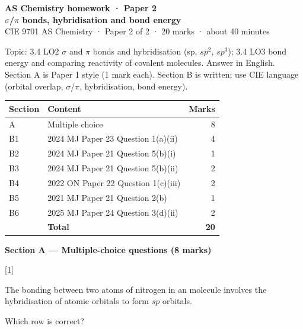\documentclass[10pt,a4paper]{article}
\newcommand{\homeworktitle}{Chemistry homework}
\newcommand{\homeworkmarks}{}
\newcommand{\sethomework}[2]{%
  \renewcommand{\homeworktitle}{#1}%
  \renewcommand{\homeworkmarks}{#2}%
}
\newcommand{\qhead}[2]{%
  \par\vspace{0.28em}%
  \Needspace{4.2em}%
  \noindent{\small\textbf{#1}}\hfill{\small[#2]}\par\vspace{0.08em}%
}
\begin{document}
\sethomework{AS Chemistry homework · Paper 2 · $\sigma$/$\pi$ bonds, hybridisation and bond energy}{20 marks}

\begin{center}
{\large\bfseries AS Chemistry homework · Paper 2}\\[0.06em]
{\large\bfseries $\sigma$/$\pi$ bonds, hybridisation and bond energy}\\[0.12em]
{\small CIE 9701 AS Chemistry · Paper 2 of 2 · 20 marks · about 40 minutes}
\end{center}

{\small Topic: 3.4 LO2 $\sigma$ and $\pi$ bonds and hybridisation (sp, $sp^{2}$, $sp^{3}$); 3.4 LO3 bond energy and comparing reactivity of covalent molecules.
Answer in English. Section A is Paper 1 style (1 mark each). Section B is written; use CIE language (orbital overlap, $\sigma$/$\pi$, hybridisation, bond energy).}

\vspace{0.15em}
{\small
\begin{tabular}{@{}llr@{}}
\toprule
\textbf{Section} & \textbf{Content} & \textbf{Marks} \\
\midrule
A & Multiple choice & 8 \\
B1 & 2024 MJ Paper 23 Question 1(a)(ii) & 4 \\
B2 & 2024 MJ Paper 21 Question 5(b)(i) & 1 \\
B3 & 2024 MJ Paper 21 Question 5(b)(ii) & 2 \\
B4 & 2022 ON Paper 22 Question 1(c)(iii) & 2 \\
B5 & 2021 MJ Paper 21 Question 2(b) & 1 \\
B6 & 2025 MJ Paper 24 Question 3(d)(ii) & 2 \\
\midrule
 & \textbf{Total} & \textbf{20} \\
\bottomrule
\end{tabular}}

\vspace{0.25em}
{\large\bfseries Section A --- Multiple-choice questions (8 marks)}\par

\Needspace{18em}
\qhead{A1.}{1}
{\small The bonding between two atoms of nitrogen in an  molecule involves the hybridisation of atomic orbitals to form $sp$ orbitals.}

{\small Which row is correct?}
\end{document}
